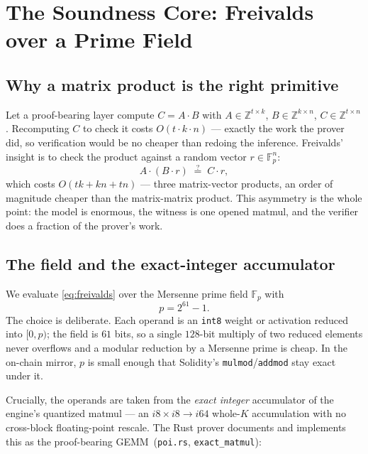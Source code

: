 \documentclass[11pt,a4paper]{article}
\begin{document}
\section{The Soundness Core: Freivalds over a Prime Field}\label{sec:soundness}

\subsection{Why a matrix product is the right primitive}

Let a proof-bearing layer compute $C = A \cdot B$ with $A \in \mathbb{Z}^{t \times k}$, $B \in \mathbb{Z}^{k \times n}$, $C \in \mathbb{Z}^{t \times n}$. Recomputing $C$ to check it costs $O(t \cdot k \cdot n)$ --- exactly the work the prover did, so verification would be no cheaper than redoing the inference. Freivalds' insight is to check the product against a random vector $r \in \mathbb{F}_p^{n}$:
\begin{equation}\label{eq:freivalds}
  A \cdot (B \cdot r) \;\overset{?}{=}\; C \cdot r ,
\end{equation}
which costs $O(t k + k n + t n)$ --- three matrix-vector products, an order of magnitude cheaper than the matrix-matrix product. This asymmetry is the whole point: the model is enormous, the witness is one opened matmul, and the verifier does a fraction of the prover's work.

\subsection{The field and the exact-integer accumulator}

We evaluate \eqref{eq:freivalds} over the Mersenne prime field $\mathbb{F}_p$ with
\begin{equation}
  p = 2^{61} - 1 .
\end{equation}
The choice is deliberate. Each operand is an \texttt{int8} weight or activation reduced into $[0,p)$; the field is $61$ bits, so a single $128$-bit multiply of two reduced elements never overflows and a modular reduction by a Mersenne prime is cheap. In the on-chain mirror, $p$ is small enough that Solidity's \texttt{mulmod}/\texttt{addmod} stay exact under it.

Crucially, the operands are taken from the \emph{exact integer} accumulator of the engine's quantized matmul --- an $i8 \times i8 \to i64$ whole-$K$ accumulation with no cross-block floating-point rescale. The Rust prover documents and implements this as the proof-bearing GEMM~(\texttt{poi.rs}, \texttt{exact\_matmul}):
\end{document}
